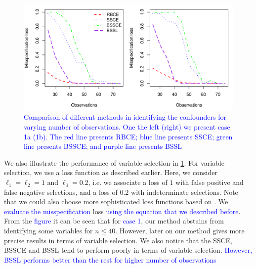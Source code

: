 \documentclass[preprint,12pt]{elsarticle}
\newcommand{\added}[1]{\textcolor{blue}{#1}}
\begin{document}
\begin{figure}[h]
	\centering
	\includegraphics[width = 0.95\linewidth]{loss_obs.pdf}
	\caption{\added{Comparison of different methods in identifying the confounders for varying number of observations. One the left (right) we present case 1a (1b). The red line presents RBCE; blue line presents SSCE; green line presents BSSCE; and purple line
			presents BSSL}}
	\label{fig:comp:loss:obs}
\end{figure}


We also illustrate the performance of variable selection in \cref{fig:comp:loss:obs}.
For variable selection, we use a loss function as described earlier.
Here, we consider
$\ell_1=\ell_2=1$ and $\ell_3= 0.2$,
i.e. we associate a loss of $1$ with false positive and false negative selections,
and a loss of $0.2$ with indeterminate selections. 
Note that we could also choose more 
sophisticated loss functions based on \citep{ZAFFALON20121282}.
We \added{evaluate the misspecification} loss \added{using the equation that we described before}.
From the \added{figure} it can be seen that for \added{case 1}, our method
abstains from identifying some variables for 
$n \le 40$. However,
later on our method gives more precise results in terms of variable
selection. We also notice that the SSCE, BSSCE and BSSL tend to perform poorly
in terms of variable selection. 
\added{However, BSSL performs better than the rest for higher number of observations} 
\end{document}
